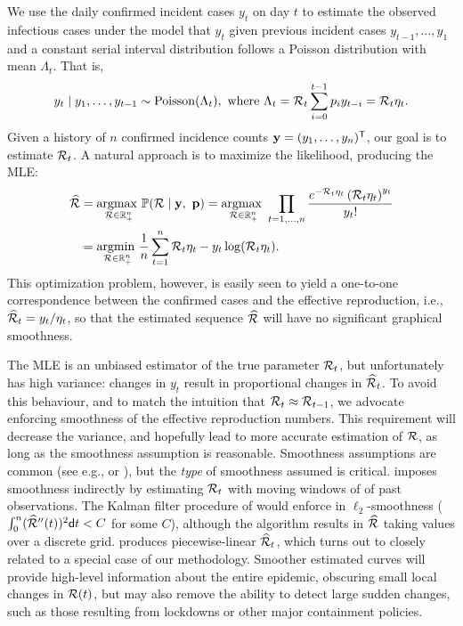 We use the daily confirmed incident cases $y_t$ on day $t$ to estimate the
observed infectious cases under the model that $y_t$ given previous incident
cases $y_{t-1},\ldots,y_1$ and a constant serial interval distribution follows a
Poisson distribution with mean $\Lambda_t$. That is, 
$$
y_t \mid y_1,\ldots,y_{t-1} \sim \mathrm{Poisson}(\Lambda_t), \textrm{ where } \Lambda_t =  \mathcal{R}_t\sum_{i=0}^{t-1}p_i y_{t-i} = \mathcal{R}_t\eta_t.$$ 
Given a history of $n$ confirmed incidence counts $\mathbf{y} = (y_1,\ldots,y_n)^{\mathsf{T}}$,
our goal is to estimate $\mathcal{R}_t$. A natural approach is to maximize the
likelihood, producing the MLE:
\begin{equation} \label{eq:mle}
  \begin{split}
    \widehat{\mathcal{R}} &= \underset{\mathcal{R} \in \mathbb{R}_+^n}{\operatorname*{argmax}\ } \mathbb{P}(\mathcal{R} \mid \mathbf{y},\ \mathbf{p})
    = \underset{\mathcal{R} \in \mathbb{R}^n_+}{\operatorname*{argmax}\ } \prod_{t = 1,\dots,n} 
    \frac{e^{- \mathcal{R}_t \eta_t} \left(\mathcal{R}_t \eta_t\right)^{y_t} }{y_t!}\\
    &= \underset{\mathcal{R}\in\mathbb{R}^n_+}{\operatorname*{argmin}\ } \frac{1}{n}\sum_{t = 1}^n \mathcal{R}_t\eta_t - y_t\log(\mathcal{R}_t\eta_t).
  \end{split}
\end{equation}
This optimization problem, however, is easily seen to yield a one-to-one
correspondence between the confirmed cases and the effective reproduction, i.e.,
$\widehat{\mathcal{R}}_t = y_t / \eta_t$, so that the estimated sequence
$\widehat{\mathcal{R}}$ will have no significant graphical smoothness.

The MLE is an unbiased estimator of the true parameter $\mathcal{R}_t$, but
unfortunately has high variance: changes in $y_t$ result in proportional changes
in $\widehat{\mathcal{R}}_t$. To avoid this behaviour, and to match the intuition that
$\mathcal{R}_t \approx \mathcal{R}_{t-1}$, we advocate enforcing smoothness of the effective
reproduction numbers. This requirement will decrease the variance, and hopefully
lead to more accurate estimation of $\mathcal{R}$, as long as the smoothness
assumption is reasonable. Smoothness assumptions are common (see e.g.,
\citet{parag2021improved} or \citet{gostic2020practical}), but the \emph{type}
of smoothness assumed is critical. \citet{cori2020package} imposes smoothness
indirectly by estimating $\mathcal{R}_t$ with moving windows of of past observations.
The Kalman filter procedure of \citet{parag2021improved} would enforce in
$\ell_2$-smoothness ($\int_0^n (\widehat{\mathcal{R}}''(t))^{2}\mathsf{d} t < C$ for some
$C$), although the algorithm results in $\widehat{\mathcal{R}}$ taking values over a
discrete grid. \citet{pascal2022nonsmooth} produces piecewise-linear
$\widehat{\mathcal{R}}_t$, which turns out to closely related to a special case of our
methodology.
Smoother estimated curves will provide high-level information about the entire
epidemic, obscuring small local changes in $\mathcal{R}(t)$, but may also remove the
ability to detect large sudden changes, such as those resulting from lockdowns
or other major containment policies. 

